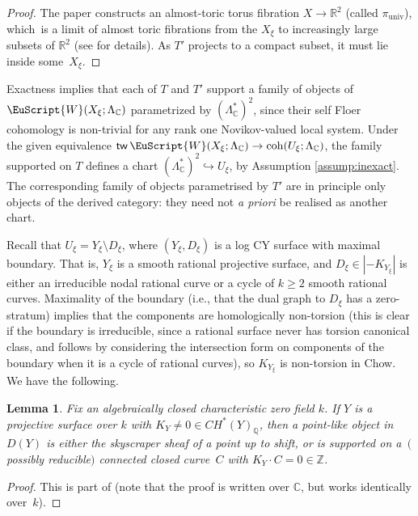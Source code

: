 \documentclass[pdftex]{sigma}
\newcommand {\ccoh} {\operatorname{coh}}
\def\scrW{\EuScript{W}}
\def\bZ{\mathbb{Z}}
\def\bQ{\mathbb{Q}}
\def\bC{\mathbb{C}}
\def\bR{\mathbb{R}}
\newtheorem{lem}[thm]{Lemma}
\theoremstyle{definition}
\DeclareMathOperator{\tw}{\mathsf{tw}}
\numberwithin{equation}{section}
\begin{document}
 \begin{proof} The paper \cite{Keating-Ward} constructs an almost-toric torus fibration $X \to \bR^2$ (called $\pi_{\textrm{univ}}$), which~is a limit of almost toric fibrations from the $X_{\xi}$ to increasingly large subsets of $\bR^2$ (see \cite[Sections~2.2 and~2.3]{Keating-Ward} for details). As $T'$ projects to a compact subset, it must lie inside some~$X_{\xi}$.
 \end{proof}

Exactness implies that each of $T$ and $T'$ support a family of objects of $\scrW(X_{\xi}; \Lambda_{\bC})$ para\-metri\-zed by $(\Lambda_\bC^*)^2$, since their self Floer cohomology is non-trivial for any rank one Novikov-valued local system.
Under the given equivalence $\tw \scrW (X_{\xi} ; \Lambda_{\bC}) \to \ccoh(U_{\xi}; \Lambda_{\bC})$,
the family supported on $T$ defines a chart $(\Lambda_\bC^*)^2 \hookrightarrow U_\xi$, by Assumption \ref{assump:inexact}.
The corresponding family of objects parametrised by $T'$ are in principle only objects of the derived category: they need not \emph{a priori} be realised as another chart.

Recall that $U_{\xi} = Y_{\xi} \setminus D_{\xi}$, where $(Y_\xi, D_\xi)$ is a log CY surface with maximal boundary. That is, $Y_\xi$ is a smooth rational projective surface, and $D_\xi \in |{-K_{Y_\xi}}|$ is either an irreducible nodal rational curve or a cycle of $k\geq 2$ smooth rational curves.
Maximality of the boundary (i.e., that the dual graph to $D_{\xi}$ has a zero-stratum) implies that the components are homologically non-torsion (this is clear if the boundary is irreducible, since a rational surface never has torsion canonical class, and follows by considering the intersection form on components of the boundary when it is a cycle of rational curves), so $K_{Y_{\xi}}$ is non-torsion in Chow. We have the following.


\begin{lem}\label{lem:point-like support}
Fix an algebraically closed characteristic zero field $k$. If $Y$ is a projective surface over $k$ with $K_Y \neq 0 \in CH^*(Y)_{\bQ}$, then a point-like object in $D(Y)$ is either the skyscraper sheaf of a point up to shift, or is supported on a~$($possibly reducible$)$ connected closed curve~$C$ with $K_Y \cdot C = 0 \in \bZ$.
\end{lem}

\begin{proof} This is part of \cite[Lemma~2.2]{Hu-Krah} (note that the proof is written over $\bC$, but works identically over~$k$).
\end{proof}
\end{document}
